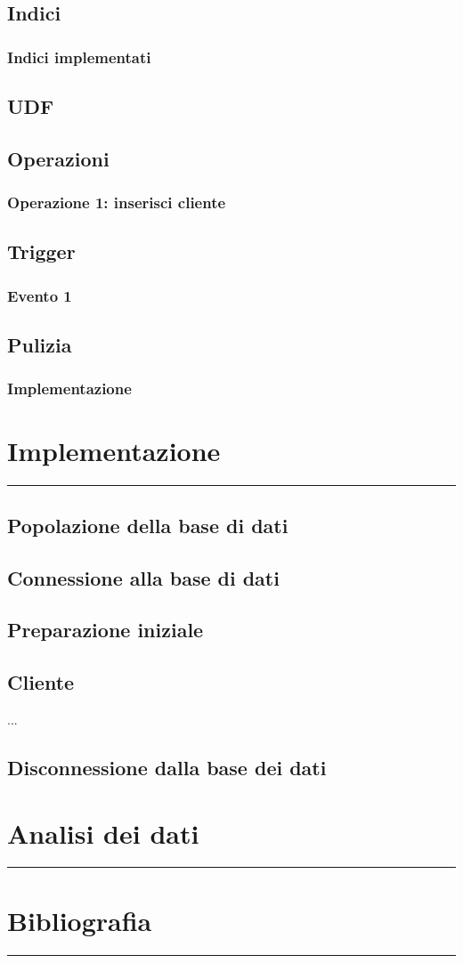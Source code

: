 \documentclass[legalpaper]{article}
\begin{document}
\subsection{Indici}
\subsubsection{Indici implementati}
\subsection{UDF}
\subsection{Operazioni}
\subsubsection{Operazione 1: inserisci cliente}
\subsection{Trigger}
\subsubsection{Evento 1}
\subsection{Pulizia}
\subsubsection{Implementazione}
\newpage

\section{Implementazione}
\rule{\linewidth}{1.5pt}
\subsection{Popolazione della base di dati}
\subsection{Connessione alla base di dati}
\subsection{Preparazione iniziale}
\subsection{Cliente}

...

\subsection{Disconnessione dalla base dei dati}
\newpage
\section{Analisi dei dati}
\rule{\linewidth}{1.5pt}

\newpage

\section{Bibliografia}
\rule{\linewidth}{1.5pt}
\end{document}

